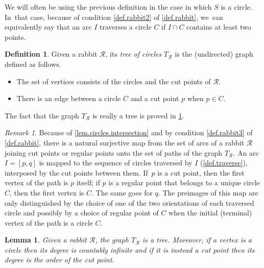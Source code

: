 \documentclass[JEP,XML,SOM,Unicode,NoFloatCountersInSection,published]{cedram}
\theoremstyle{plain}
\newtheorem{lemma}[theorem]{Lemma}
\theoremstyle{definition}
\newtheorem{definition}[theorem]{Definition}
\theoremstyle{remark}
\newtheorem{remark}[theorem]{Remark}
\newcommand{\R}{\mathcal{R}}
\begin{document}
We will often be using the previous definition in the case in which $S$ is a circle. In~that case, because of condition \cref{def.rabbit2} of \cref{def.rabbit}, we~can equivalently say that an arc $I$ traverses a circle $C$ if $I \cap C$ contains at least two points.

\begin{definition}
\label{def.tree.of.circles}
Given a rabbit $\R$, its \emph{tree of circles} $T_\R$ is the (undirected) graph defined as follows.
\begin{itemize}
\item The set of vertices consists of the circles and the cut points of $\R$.
\item There is an edge between a circle $C$ and a cut point $p$ when $p \in C$.
\end{itemize}
\end{definition}

The fact that the graph $T_\R$ is really a tree is proved in \cref{lem.tree.of.circles.is.tree}.

\begin{remark}
\label{rmk.arcs.and.paths}
Because of \cref{lem.circles.intersection} and by condition \cref{def.rabbit3} of \cref{def.rabbit}, there is a natural surjective map from the set of arcs of a rabbit $\R$ joining cut points or regular points onto the set of paths of the graph $T_\R$.
An arc $I = [p,q]$ is mapped to the sequence of circles traversed by $I$ (\cref{def.traverse}), interposed by the cut points between them. If~$p$ is a cut point, then the first vertex of the path is $p$ itself;
if $p$ is a regular point that belongs to a unique circle $C$, then the first vertex is $C$.
The same goes for $q$.
The preimages of this map are only distinguished by the choice of one of the two orientations of each traversed circle and possibly by a choice of regular point of $C$ when the initial (terminal) vertex of the path is a circle $C$.
\end{remark}

\begin{lemma}
\label{lem.tree.of.circles.is.tree}
Given a rabbit $\R$, the graph $T_\R$ is a tree.
Moreover, if a vertex is a circle then its degree is countably infinite and if it is instead a cut point then its degree is the order of the cut point.
\end{lemma}
\end{document}
